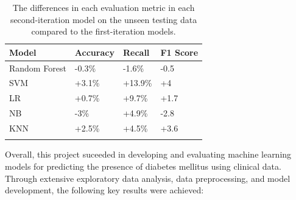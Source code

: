 \documentclass[12pt]{report}
\newcommand{\para}{\vspace{8pt}\noindent}
\begin{document}
\begin{longtable}{ | p{} | p{} | p{} | p{} | }
    \hline
    \cellcolor{blue!25} Model & \cellcolor{blue!25} Accuracy & \cellcolor{blue!25} Recall & \cellcolor{blue!25} F1 Score\\
    \hline
    Random Forest & \cellcolor{red!25} -0.3\% & \cellcolor{red!25}-1.6\% & \cellcolor{red!25} -0.5\\ 
    \hline
    SVM & \cellcolor{green!18}+3.1\% & \cellcolor{green!18}+13.9\% & \cellcolor{green!18}+4\\ 
    \hline
    LR & \cellcolor{green!18}+0.7\% & \cellcolor{green!18}+9.7\% & \cellcolor{green!18}+1.7\\
    \hline
    NB & \cellcolor{red!25}-3\% & \cellcolor{green!18}+4.9\% & \cellcolor{red!25}-2.8\\
    \hline
    KNN & \cellcolor{green!18}+2.5\% & \cellcolor{green!18}+4.5\% & \cellcolor{green!18}+3.6\\
    \hline
    \caption{The differences in each evaluation metric in each second-iteration model on the unseen testing data compared to the first-iteration models.}\label{tab:Improvements}
\end{longtable}

\pagebreak 
\para Overall, this project suceeded in developing and evaluating machine learning models for predicting the presence of diabetes mellitus using clinical data. 
Through extensive exploratory data analysis, data preprocessing, and model development, the following key results were achieved:
\end{document}
